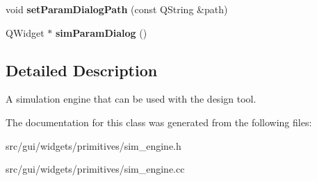 \begin{DoxyCompactItemize}
\item 
void {\bfseries set\+Param\+Dialog\+Path} (const Q\+String \&path)\hypertarget{classprim_1_1SimEngine_a2f7ca0d7f3c65e6df3a8acf18de4578f}{}\label{classprim_1_1SimEngine_a2f7ca0d7f3c65e6df3a8acf18de4578f}

\item 
Q\+Widget $\ast$ {\bfseries sim\+Param\+Dialog} ()\hypertarget{classprim_1_1SimEngine_a5bf4d1d1b18644b19b92290711455c16}{}\label{classprim_1_1SimEngine_a5bf4d1d1b18644b19b92290711455c16}

\end{DoxyCompactItemize}


\subsection{Detailed Description}
A simulation engine that can be used with the design tool. 

The documentation for this class was generated from the following files\+:\begin{DoxyCompactItemize}
\item 
src/gui/widgets/primitives/sim\+\_\+engine.\+h\item 
src/gui/widgets/primitives/sim\+\_\+engine.\+cc\end{DoxyCompactItemize}
